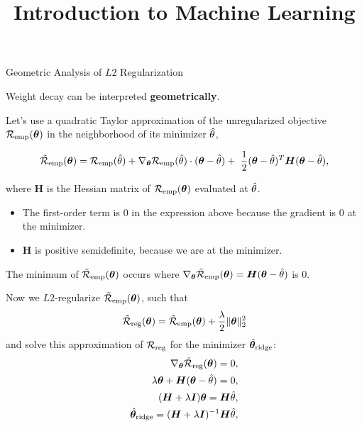 \documentclass[11pt,compress,t,notes=noshow, xcolor=table]{beamer}
\title{Introduction to Machine Learning}
\begin{document}

\begin{vbframe}{Geometric Analysis of $L2$ Regularization}

Weight decay can be interpreted \textbf{geometrically}. 

\lz 

Let's use a quadratic Taylor approximation of the unregularized objective $\mathcal{R}_{\text{emp}}(\bm{\theta})$ in the neighborhood of its minimizer $\hat{\theta}$,  

$$ \mathcal{\tilde R}_{\text{emp}}(\bm{\theta})= \mathcal{R}_{\text{emp}}(\hat{\theta}) + \nabla_{\bm{\theta}} \mathcal{R}_{\text{emp}}(\hat{\theta})\cdot(\bm{\theta} - \hat{\theta}) + \ \frac{1}{2} (\bm{\theta} - \hat{\theta})^T \bm{H} (\bm{\theta} - \hat{\theta}), $$

where $\bm{H}$ is the Hessian matrix of $\mathcal{R}_{\text{emp}}(\bm{\theta})$ evaluated at $\hat{\theta}$. 

\lz

\begin{itemize}
  \item The first-order term is 0 in the expression above because the gradient is $0$ at the minimizer.
  \item $\bm{H}$ is positive semidefinite, because we are at the minimizer.
\end{itemize}

\lz

\framebreak

\normalsize

The minimum of $\mathcal{\tilde R}_{\text{emp}}(\bm{\theta})$ occurs where $\nabla_{\bm{\theta}}\mathcal{\tilde R}_{\text{emp}}(\bm{\theta}) = \bm{H}(\bm{\theta} - \hat{\theta})$ is $0$.

Now we $L2$-regularize $\mathcal{\tilde R}_{\text{emp}}(\bm{\theta})$, such that 
\[
\mathcal{\tilde R}_{\text{reg}}(\bm{\theta}) = \mathcal{\tilde R}_{\text{emp}}(\bm{\theta}) + \frac{\lambda}{2} \|\bm{\theta}\|^2_2\]
and solve this approximation of $\mathcal{R}_{\text{reg}}$ for the minimizer $\hat{\bm{\theta}}_{\text{ridge}}$:
\begin{align*}
 \nabla_{\bm{\theta}}\mathcal{\tilde R}_{\text{reg}}(\bm{\theta}) = 0,\\
  \lambda \bm{\theta} + \bm{H}(\bm{\theta} - \hat{\theta}) = 0,\\
      (\bm{H} + \lambda \boldsymbol{I}) \bm{\theta} = \bm{H} \hat{\theta},\\
      \hat{\bm{\theta}}_{\text{ridge}} = (\bm{H} + \lambda \boldsymbol{I})^{-1}\bm{H} \hat{\theta},
\end{align*}


\end{vbframe}
\end{document}
